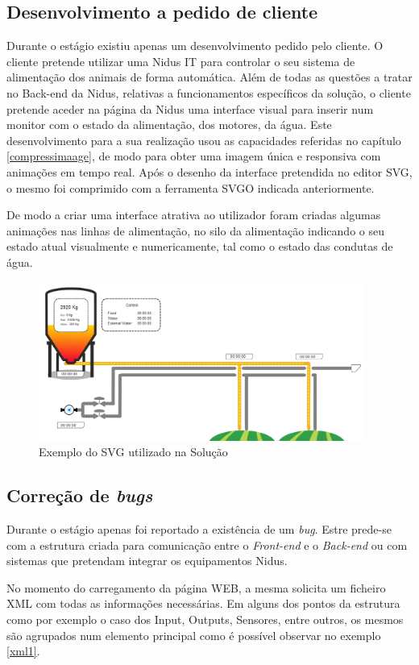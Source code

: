 \subsection{Desenvolvimento a pedido de cliente}\label{custom}

\par Durante o estágio existiu apenas um desenvolvimento pedido pelo cliente. O cliente pretende utilizar uma Nidus IT para controlar o seu sistema de alimentação dos animais de forma automática. Além de todas as questões a tratar no Back-end da Nidus, relativas a funcionamentos específicos da solução, o cliente pretende aceder na página da Nidus uma interface visual para inserir num monitor com o estado da alimentação, dos motores, da água. Este desenvolvimento para a sua realização usou as capacidades referidas no capítulo \ref{compressimaage}, de modo para obter uma imagem única e responsiva com animações em tempo real. Após o desenho da interface pretendida no editor SVG, o mesmo foi comprimido com a ferramenta SVGO indicada anteriormente. \par De modo a criar uma interface atrativa ao utilizador foram criadas algumas animações nas linhas de alimentação, no silo da alimentação indicando o seu estado atual visualmente e numericamente, tal como o estado das condutas de água.

\begin{figure}[ht]
\centering
\includegraphics[width=0.95\textwidth]{images/svgpig.png}
\caption{Exemplo do SVG utilizado na Solução}\label{pig}
\end{figure}

\subsection{Correção de \textit{bugs}}\label{Bug}

\par Durante o estágio apenas foi reportado a existência de um \textit{bug}. Estre prede-se com a estrutura criada para comunicação entre o \textit{Front-end} e o \textit{Back-end} ou com sistemas que pretendam integrar os equipamentos Nidus.
\par No momento do carregamento da página WEB, a mesma solicita um ficheiro XML com todas as informações necessárias. Em alguns dos pontos da estrutura como por exemplo o caso dos Input, Outputs, Sensores, entre outros, os mesmos são agrupados num elemento principal como é possível observar no exemplo \ref{xml1}.


